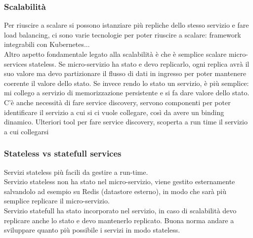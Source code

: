 \documentclass[16px]{article}
\begin{document}
\subsubsection{Scalabilità}
Per riuscire a scalare si possono istanziare più repliche dello stesso servizio e fare load balancing, ci sono varie tecnologie per poter riuscire a scalare: framework integrabili con Kubernetes...\\ Altro aspetto fondamentale legato alla scalabilità è che è semplice scalare micro-services stateless. Se micro-servizio ha stato e devo replicarlo, ogni replica avrà il suo valore ma devo partizionare il flusso di dati in ingresso per poter mantenere coerente il valore dello stato. Se invece rendo lo stato un servizio, è più semplice: mi collego a servizio di memorizzazione persistente e si fa dare valore dello stato.\\ C'è anche necessità di fare service discovery, servono componenti per poter identificare il servizio a cui si ci vuole collegare, così da avere un binding dinamico. Ulteriori tool per fare service discovery, scoperta a run time il servizio a cui collegarsi
\subsubsection{Stateless vs statefull services}
Servizi stateless più facili da gestire a run-time.\\ Servizio stateless non ha stato nel micro-servizio, viene gestito esternamente salvandolo ad esempio su Redis (datastore esterno), in modo che sarà più semplice replicare il micro-servizio.\\ Servizio statefull ha stato incorporato nel servizio, in caso di scalabilità devo replicare anche lo stato e devo mantenerlo replicato. Buona norma andare a sviluppare quanto più possibile i servizi in modo stateless.
\end{document}
